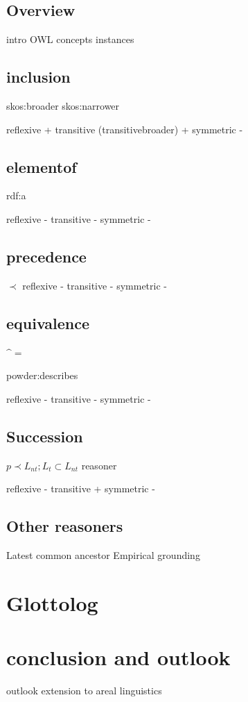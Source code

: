 \documentclass[a4paper,10pt]{article}
\begin{document}
\subsection{Overview}
intro OWL
concepts 
instances

\subsection{inclusion}
skos:broader
skos:narrower

reflexive +
transitive (transitivebroader) +
symmetric -

\subsection{elementof}
rdf:a

reflexive -
transitive -
symmetric -

\subsection{precedence}
$\prec$
reflexive -
transitive -
symmetric -

\subsection{equivalence}
$ \^=   $

powder:describes


reflexive -
transitive -
symmetric -

\subsection{Succession}

$p \prec L_{nt}; L_{t} \subset L_{nt} $
reasoner

reflexive -
transitive +
symmetric -

\subsection{Other reasoners}
Latest common ancestor
Empirical grounding	

\section{Glottolog}
\section{conclusion and outlook}
    outlook
        extension to areal linguistics
\end{document}
